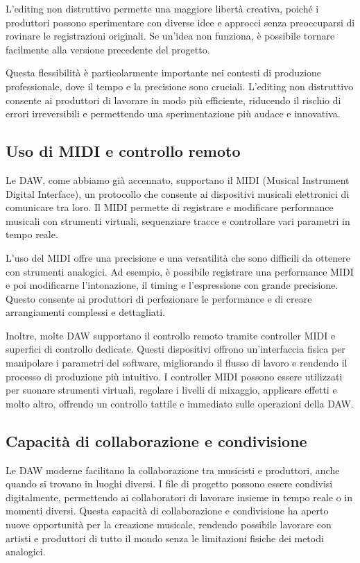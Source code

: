 \documentclass{book}
\begin{document}
L’editing non distruttivo permette una maggiore libertà creativa, poiché i produttori possono sperimentare con diverse idee e approcci senza preoccuparsi di rovinare le registrazioni originali. Se un’idea non funziona, è possibile tornare facilmente alla versione precedente del progetto.

Questa flessibilità è particolarmente importante nei contesti di produzione professionale, dove il tempo e la precisione sono cruciali. L’editing non distruttivo consente ai produttori di lavorare in modo più efficiente, riducendo il rischio di errori irreversibili e permettendo una sperimentazione più audace e innovativa.

\subsection{Uso di MIDI e controllo remoto}

Le DAW, come abbiamo già accennato, supportano il MIDI (Musical Instrument Digital Interface), un protocollo che consente ai dispositivi musicali elettronici di comunicare tra loro. Il MIDI permette di registrare e modificare performance musicali con strumenti virtuali, sequenziare tracce e controllare vari parametri in tempo reale.

L’uso del MIDI offre una precisione e una versatilità che sono difficili da ottenere con strumenti analogici. Ad esempio, è possibile registrare una performance MIDI e poi modificarne l’intonazione, il timing e l’espressione con grande precisione. Questo consente ai produttori di perfezionare le performance e di creare arrangiamenti complessi e dettagliati.

Inoltre, molte DAW supportano il controllo remoto tramite controller MIDI e superfici di controllo dedicate. Questi dispositivi offrono un’interfaccia fisica per manipolare i parametri del software, migliorando il flusso di lavoro e rendendo il processo di produzione più intuitivo. I controller MIDI possono essere utilizzati per suonare strumenti virtuali, regolare i livelli di mixaggio, applicare effetti e molto altro, offrendo un controllo tattile e immediato sulle operazioni della DAW.

\subsection{Capacità di collaborazione e condivisione}

Le DAW moderne facilitano la collaborazione tra musicisti e produttori, anche quando si trovano in luoghi diversi. I file di progetto possono essere condivisi digitalmente, permettendo ai collaboratori di lavorare insieme in tempo reale o in momenti diversi. Questa capacità di collaborazione e condivisione ha aperto nuove opportunità per la creazione musicale, rendendo possibile lavorare con artisti e produttori di tutto il mondo senza le limitazioni fisiche dei metodi analogici.
\end{document}
